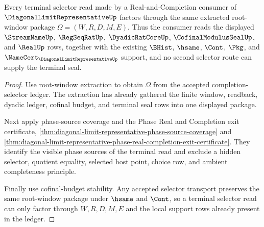 \begin{theorem}
\label{thm:diagonal-limit-representative-terminal-selector-exactness}
Every terminal selector read made by a Real-and-Completion consumer of $\DiagonalLimitRepresentativeUp$ factors through the same extracted root-window package $\Omega=(W,R,D,M,E)$. Thus the consumer reads the displayed $\StreamNameUp$, $\RegSeqRatUp$, $\DyadicRatCoreUp$, $\CofinalModulusSealUp$, and $\RealUp$ rows, together with the existing $\BHist$, $\hsame$, $\Cont$, $\Pkg$, and $\NameCert_{\DiagonalLimitRepresentativeUp}$ support, and no second selector route can supply the terminal seal.
\end{theorem}
\begin{proof}
Use root-window extraction to obtain $\Omega$ from the accepted completion-selector ledger. The extraction has already gathered the finite window, readback, dyadic ledger, cofinal budget, and terminal seal rows into one displayed package.

Next apply phase-source coverage and the Phase Real and Completion exit certificate, \autoref{thm:diagonal-limit-representative-phase-source-coverage} and \autoref{thm:diagonal-limit-representative-phase-real-completion-exit-certificate}. They identify the visible phase sources of the terminal read and exclude a hidden selector, quotient equality, selected host point, choice row, and ambient completeness principle.

Finally use cofinal-budget stability. Any accepted selector transport preserves the same root-window package under $\hsame$ and $\Cont$, so a terminal selector read can only factor through $W,R,D,M,E$ and the local support rows already present in the ledger.
\end{proof}


